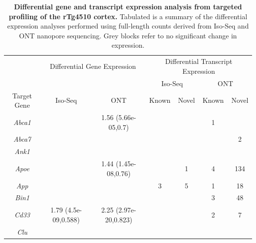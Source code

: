 \begin{table}[]
	\centering
	\captionsetup{width=0.95\textwidth}
	\caption[Differential expression analysis from targeted profiling of the rTg4510 cortex]%
	{\textbf{Differential gene and transcript expression analysis from targeted profiling of the rTg4510 cortex.} Tabulated is a summary of the differential expression analyses performed using full-length counts derived from Iso-Seq and ONT nanopore sequencing. Grey blocks refer to no significant change in expression.}
	\label{tab: de_analysis}
	\setlength\tabcolsep{4pt} %
	\begin{threeparttable}
	\begin{tabular}{@{}ccccccc@{}}
		\toprule
		&
		\multicolumn{2}{c}{Differential Gene Expression\tnote{a} } &
		\multicolumn{4}{c}{Differential Transcript Expression\tnote{b}} \\ \cmidrule(l){2-7} 
		&
		&
		&
		\multicolumn{2}{c}{Iso-Seq} &
		\multicolumn{2}{c}{ONT} \\ \cmidrule(l){4-7} 
		\multirow{-3}{*}{Target Gene} &
		\multirow{-2}{*}{Iso-Seq} &
		\multirow{-2}{*}{ONT} &
		Known &
		Novel &
		Known &
		Novel \\ \midrule
		\textit{Abca1} &
		\cellcolor[HTML]{EFEFEF} &
		1.56 (5.66e-05,0.7) &
		\cellcolor[HTML]{EFEFEF} &
		\cellcolor[HTML]{EFEFEF} &
		1 &
		\cellcolor[HTML]{EFEFEF} \\
		\textit{Abca7} &
		\cellcolor[HTML]{EFEFEF} &
		\cellcolor[HTML]{EFEFEF} &
		\cellcolor[HTML]{EFEFEF} &
		\cellcolor[HTML]{EFEFEF} &
		\cellcolor[HTML]{EFEFEF} &
		2 \\
		\textit{Ank1} &
		\cellcolor[HTML]{EFEFEF} &
		\cellcolor[HTML]{EFEFEF} &
		\cellcolor[HTML]{EFEFEF} &
		\cellcolor[HTML]{EFEFEF} &
		\cellcolor[HTML]{EFEFEF} &
		\cellcolor[HTML]{EFEFEF} \\
		\textit{Apoe} &
		\cellcolor[HTML]{EFEFEF} &
		1.44 (1.45e-08,0.76) &
		\cellcolor[HTML]{EFEFEF}&
		1 &
		4 &
		134 \\
		\textit{App} &
		\cellcolor[HTML]{EFEFEF} &
		\cellcolor[HTML]{EFEFEF} &
		3 &
		5 &
		1 &
		18 \\
		\textit{Bin1} &
		\cellcolor[HTML]{EFEFEF} &
		\cellcolor[HTML]{EFEFEF} &
		\cellcolor[HTML]{EFEFEF} &
		\cellcolor[HTML]{EFEFEF} &
		3 &
		48 \\
		\textit{Cd33} &
		1.79 (4.5e-09,0.588) &
		2.25 (2.97e-20,0.823) &
		\cellcolor[HTML]{EFEFEF} &
		\cellcolor[HTML]{EFEFEF} &
		2 &
		7 \\
		\textit{Clu} &
		\cellcolor[HTML]{EFEFEF} &

\end{tabular}
\end{threeparttable}
\end{table}
